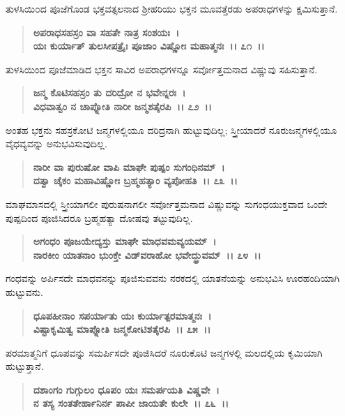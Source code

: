 ತುಳಸಿಯಿ೦ದ ಪೂಜೆಗೊಂಡ ಭಕ್ತವತ್ಸಲನಾದ ಶ‍್ರೀಹರಿಯು ಭಕ್ತನ ಮೂವತ್ತೆರಡು ಅಪರಾಧಗಳನ್ನು ಕ್ಷಮಿಸುತ್ತಾನೆ.

\begin{verse}
\textbf{ಅಪರಾಧಸಹಸ್ರಂ ವಾ ಸಹತೇ ನಾತ್ರ ಸಂಶಯಃ~।}\\\textbf{ಯಃ ಕುರ್ಯಾತ್ ತುಲಸೀಪತ್ರೈಃ ಪೂಜಾಂ ವಿಷ್ಣೋಃ ಮಹಾತ್ಮನಃ~।। ೭೧~।।}
\end{verse}

ತುಳಸಿಯಿಂದ ಪೂಜೆಮಾಡಿದ ಭಕ್ತನ ಸಾವಿರ ಅಪರಾಧಗಳನ್ನೂ ಸರ್ವೋತ್ತಮನಾದ ವಿಷ್ಣುವು ಸಹಿಸುತ್ತಾನೆ.

\begin{verse}
\textbf{ಜನ್ಮ ಕೊಟಿಸಹಸ್ರಂ ತು ದರಿದ್ರೋ ನ ಭವೇನ್ನರಃ~।}\\\textbf{ವಿಧವಾತ್ವಂ ನ ಚಾಪ್ನೋತಿ ನಾರೀ ಜನ್ಮಶತೈರಪಿ~।। ೭೨~।।}
\end{verse}

ಅಂತಹ ಭಕ್ತನು ಸಹಸ್ರಕೋಟಿ ಜನ್ಮಗಳಲ್ಲಿಯೂ ದರಿದ್ರನಾಗಿ ಹುಟ್ಟುವುದಿಲ್ಲ; ಸ್ತ್ರೀಯಾದರೆ ನೂರುಜನ್ಮಗಳಲ್ಲಿಯೂ ವೈಧವ್ಯವನ್ನು ಅನುಭವಿಸುವುದಿಲ್ಲ.

\begin{verse}
\textbf{ನಾರೀ ವಾ ಪುರುಷೋ ವಾಪಿ ಮಾಘೇ ಪುಷ್ಪಂ ಸುಗಂಧಿನಮ್~।}\\\textbf{ದತ್ವಾ ಚೈಕಂ ಮಹಾವಿಷ್ಣೋಃ ಬ್ರಹ್ಮಹತ್ಯಾಂ ವ್ಯಪೋಹತಿ~।। ೭೩~।।}
\end{verse}

ಮಾಘಮಾಸದಲ್ಲಿ ಸ್ತ್ರೀಯಾಗಲೀ ಪುರುಷನಾಗಲೀ ಸರ್ವೋತ್ತಮನಾದ ವಿಷ್ಣುವನ್ನು ಸುಗಂಧಯುಕ್ತವಾದ ಒಂದೇ ಪುಷ್ಪದಿಂದ ಪೂಜಿಸಿದರೂ ಬ್ರಹ್ಮಹತ್ಯಾ ದೋಷವು ತಟ್ಟುವುದಿಲ್ಲ.

\begin{verse}
\textbf{ಅಗಂಧಂ ಪೂಜಯೇದ್ಯಸ್ತು ಮಾಘೇ ಮಾಧವಮವ್ಯಯಮ್~।}\\\textbf{ನಾರಕೀಂ ಯಾತನಾಂ ಭುಂಕ್ತೇ ವಿಡ್‌ವರಾಹೋ ಭವೇದ್ಧ್ರುವಮ್~।। ೭೪~।।}
\end{verse}

ಗಂಧವನ್ನು ಅರ್ಪಿಸದೇ ಮಾಧವನನ್ನು ಪೂಜಿಸುವವನು ನರಕದಲ್ಲಿ ಯಾತನೆಯನ್ನು ಅನುಭವಿಸಿ ಊರಹಂದಿಯಾಗಿ ಹುಟ್ಟುವನು.

\begin{verse}
\textbf{ಧೂಪಹೀನಾಂ ಸಪರ್ಯಾತು ಯಃ ಕುರ್ಯಾತ್ಪರಮಾತ್ಮನಃ~।}\\\textbf{ವಿಷ್ಟಾಕೃಮಿತ್ವ ಮಾಪ್ನೋತಿ ಜನ್ಮಕೋಟಿಶತೈರಪಿ~।। ೭೫~।।}
\end{verse}

ಪರಮಾತ್ಮನಿಗೆ ಧೂಪವನ್ನು ಸಮರ್ಪಿಸದೇ ಪೂಜಿಸಿದರೆ ನೂರುಕೊಟಿ ಜನ್ಮಗಳಲ್ಲಿ ಮಲದಲ್ಲಿಯ ಕೃಮಿಯಾಗಿ ಹುಟ್ಟುತ್ತಾನೆ.

\begin{verse}
\textbf{ದಶಾಂಗಂ ಗುಗ್ಗುಲಂ ಧೂಪಂ ಯಃ ಸಮರ್ಪಯತಿ ವಿಷ್ಣವೇ~।}\\\textbf{ನ ತಸ್ಯ ಸಂತತೇರ್ಹಾನಿರ್ನ ಪಾಪೀ ಜಾಯತೇ ಕುಲೇ~।। ೭೬~।।}
\end{verse}

